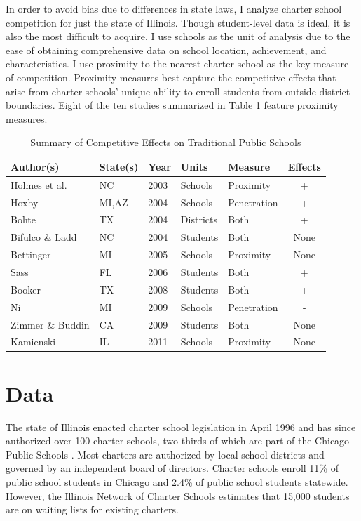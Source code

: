 \documentclass[11pt]{article}
\begin{document}
In order to avoid bias due to differences in state laws, I analyze charter school competition for just the state of Illinois.  Though student-level data is ideal, it is also the most difficult to acquire.  I use schools as the unit of analysis due to the ease of obtaining comprehensive data on school location, achievement, and characteristics.  I use proximity to the nearest charter school as the key measure of competition.  Proximity measures best capture the competitive effects that arise from charter schools' unique ability to enroll students from outside district boundaries.  Eight of the ten studies summarized in Table 1 feature proximity measures.

\begin{table}[h]
\caption{Summary of Competitive Effects on Traditional Public Schools}
  \centering
    \begin{tabular}{| l | l | l | l | l | c |}
    \hline
    Author(s) & State(s) & Year & Units & Measure & Effects \\ \hline
    Holmes et al. & NC & 2003 & Schools & Proximity & + \\
    Hoxby & MI,AZ & 2004 & Schools & Penetration & + \\ 
    Bohte & TX & 2004 & Districts & Both & + \\
    Bifulco \& Ladd & NC & 2004 & Students & Both & None \\
    Bettinger & MI & 2005 & Schools & Proximity & None \\
    Sass & FL & 2006 & Students & Both & + \\
    Booker & TX & 2008 & Students & Both & + \\ 
    Ni & MI & 2009 & Schools & Penetration & - \\
    Zimmer \& Buddin & CA & 2009 & Students & Both & None \\
    Kamienski & IL & 2011 & Schools & Proximity & None \\       
    \hline
    \end{tabular}
\end{table}

\nocite{hoxby04,holmes03,booker08,bohte04,bettinger05,bifulco04,kamienski11,sass06,ni09}

\section{Data}
The state of Illinois enacted charter school legislation in April 1996 and has since authorized over 100 charter schools, two-thirds of which are part of the Chicago Public Schools \citep{illinois_network_of_charter_schools_profiles_2012}.  Most charters are authorized by local school districts and governed by an independent board of directors.  Charter schools enroll 11\% of public school students in Chicago and 2.4\% of public school students statewide.  However, the Illinois Network of Charter Schools estimates that 15,000 students are on waiting lists for existing charters.
\end{document}
